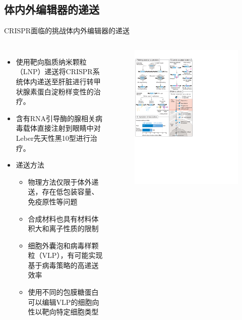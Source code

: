 \documentclass{beamer}
\begin{document}
	\subsection{体内外编辑器的递送}
	\begin{frame}{CRISPR面临的挑战}{体内外编辑器的递送}
		\begin{columns}
			\begin{itemize}
				\item 使用靶向脂质纳米颗粒（LNP）递送将CRISPR系统体内递送至肝脏进行转甲状腺素蛋白淀粉样变性的治疗。
				\item 含有RNA引导酶的腺相关病毒载体直接注射到眼睛中对Leber先天性黑10型进行治疗。
				\item 递送方法
				\begin{itemize}
					\item 物理方法仅限于体外递送，存在低包装容量、免疫原性等问题
					\item 合成材料也具有材料体积大和离子性质的限制
					\item 细胞外囊泡和病毒样颗粒（VLP），有可能实现基于病毒策略的高递送效率
					\item 使用不同的包膜糖蛋白可以编辑VLP的细胞向性以靶向特定细胞类型
				\end{itemize}
			\end{itemize}

			\begin{figure}
				\centering
				\includegraphics[width=\textwidth]{img/edit.pdf}
			\end{figure}

		\end{columns}
	\end{frame}
	
\end{document}
